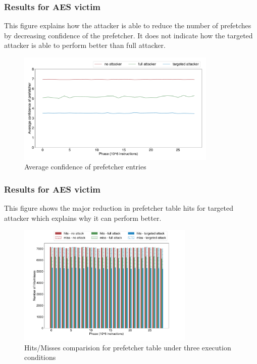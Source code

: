 \documentclass[10pt,usenames,dvipsnames]{beamer}
\begin{document}
\begin{frame}
\frametitle{Results for AES victim}
This figure explains how the attacker is able to reduce the number of prefetches by decreasing
confidence of the prefetcher. It does not indicate how the targeted attacker is able to perform
better than full attacker.
\begin{figure}[ht]
    \centering
    \includegraphics[width=0.85\textwidth]{avg_conf}
    \caption{Average confidence of prefetcher entries}
    \label{fig:prefetch_attack}
\end{figure}
\end{frame}


\begin{frame}
\frametitle{Results for AES victim}
This figure shows the major reduction in prefetcher table hits for targeted attacker which
explains why it can perform better.
\begin{figure}[ht]
    \centering
    \includegraphics[width=0.75\textwidth]{pf_hits}
    \caption{Hits/Misses comparision for prefetcher table under three execution conditions}
\end{figure}
\end{frame}
\end{document}
